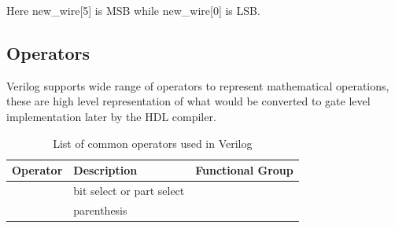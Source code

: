 \documentclass[a4paper,10pt]{article}
\makeatletter
\def\zapcolorreset{\let\reset@color\relax\ignorespaces}
\def\colorrows#1{\noalign{\aftergroup\zapcolorreset#1}\ignorespaces}
\theoremstyle{mytheor}
\makeatother
\begin{document}
Here new\_wire[{\color{orange}5}] is MSB while new\_wire[{\color{orange}0}] is LSB.
\subsection*{Operators}
Verilog supports wide range of operators to represent mathematical operations, these are high level representation of what would be converted to gate level implementation later by the HDL compiler.

\begin{table}[h]
  \begin{center}
    \label{Table:operators-table}
    \caption{List of common operators used in Verilog}
    \renewcommand{\arraystretch}{1.1}
    \begin{tabularx}{.8\textwidth}{|X|X|X|} 
      \hline
      \rowcolor{greatblue}
      \color{white}  Operator & \color{white}Description & \color{white}Functional Group \\
      \hline
      \text{[]} & bit select or part select &  \\
      
      \hline
      \text{()} & parenthesis &  \\
      

\end{tabularx}
\end{center}
\end{table}
\end{document}
